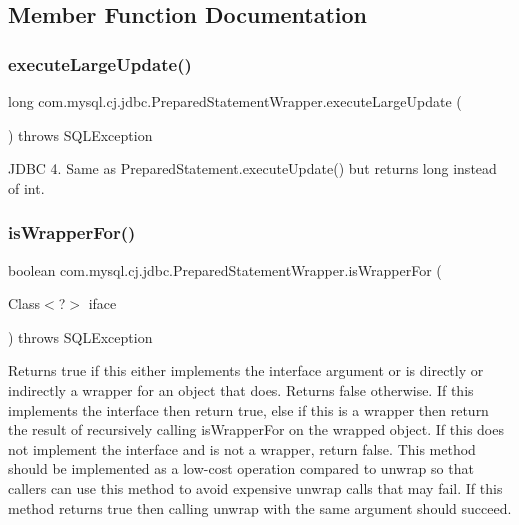 \subsection{Member Function Documentation}
\mbox{\label{classcom_1_1mysql_1_1cj_1_1jdbc_1_1_prepared_statement_wrapper_a7a9dc4ef722d9b5288f0a073168d88c1}} 
\subsubsection{\texorpdfstring{execute\+Large\+Update()}{executeLargeUpdate()}}
{\footnotesize\ttfamily long com.\+mysql.\+cj.\+jdbc.\+Prepared\+Statement\+Wrapper.\+execute\+Large\+Update (\begin{DoxyParamCaption}{ }\end{DoxyParamCaption}) throws S\+Q\+L\+Exception}

J\+D\+BC 4. Same as Prepared\+Statement.\+execute\+Update() but returns long instead of int. \mbox{\label{classcom_1_1mysql_1_1cj_1_1jdbc_1_1_prepared_statement_wrapper_a316f20ff93887f64bc06e86eac294a38}} 
\subsubsection{\texorpdfstring{is\+Wrapper\+For()}{isWrapperFor()}}
{\footnotesize\ttfamily boolean com.\+mysql.\+cj.\+jdbc.\+Prepared\+Statement\+Wrapper.\+is\+Wrapper\+For (\begin{DoxyParamCaption}\item[{Class$<$?$>$}]{iface }\end{DoxyParamCaption}) throws S\+Q\+L\+Exception}

Returns true if this either implements the interface argument or is directly or indirectly a wrapper for an object that does. Returns false otherwise. If this implements the interface then return true, else if this is a wrapper then return the result of recursively calling {\ttfamily is\+Wrapper\+For} on the wrapped object. If this does not implement the interface and is not a wrapper, return false. This method should be implemented as a low-\/cost operation compared to {\ttfamily unwrap} so that callers can use this method to avoid expensive {\ttfamily unwrap} calls that may fail. If this method returns true then calling {\ttfamily unwrap} with the same argument should succeed.


